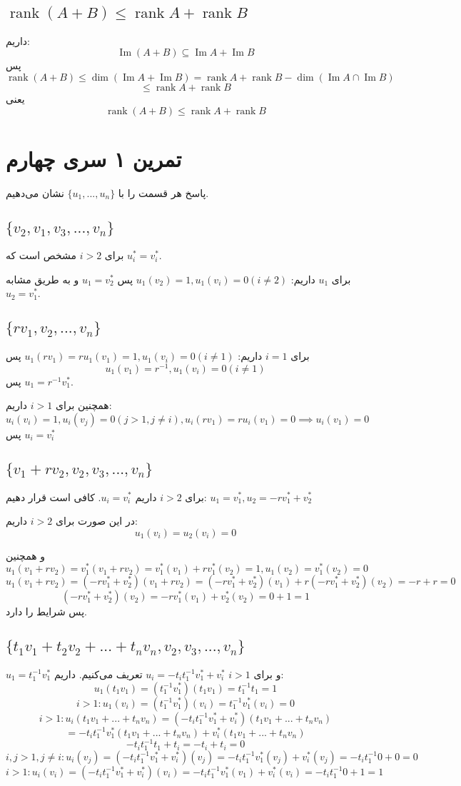 \documentclass[12pt,a4paper]{article}
\DeclareMathOperator{\rank}{rank}
\DeclareMathOperator{\im}{Im}
\begin{document}
\subsection{$\rank(A + B) \leq \rank A + \rank B$}
داریم:
$$
\im (A+B) \subseteq \im A + \im B
$$
پس
$$
\rank(A+B) \leq \dim(\im A + \im B) =
\rank A + \rank B - \dim(\im A \cap \im B)
$$
$$
\leq \rank A + \rank B
$$
یعنی
$$
\rank (A+B) \leq \rank A + \rank B
$$

\section{تمرین ۱ سری چهارم}
پاسخ هر قسمت را با 
$\{u_1, ..., u_n\}$
نشان می‌دهیم.
\subsection{
$\{v_2, v_1, v_3, ..., v_n\}$
}
برای $i > 2$ مشخص است که 
$u^{*}_i = v^{*}_i$.

برای 
$u_1$
داریم:
$u_1(v_2) = 1, u_1(v_i) = 0 (i \neq 2)$
پس
$u_1 = v^{*}_2$
و به طریق مشابه 
$u_2 = v^{*}_1$.

\subsection{
$\{rv_1, v_2, ..., v_n\}$
}
برای $i=1$ داریم:
$u_1(rv_1) = ru_1(v_1) = 1, u_1(v_i) = 0 (i \neq 1)$
پس 
$$u_1(v_1) = r^{-1}, u_1(v_i) = 0 (i \neq 1)$$
پس
$u_1 = r^{-1}v^*_1$.

همچنین برای $i > 1$ داریم:
$$u_i(v_i) = 1, u_i(v_j) = 0 (j > 1, j \neq i), u_i(rv_1) = r u_i(v_1) = 0 \implies u_i(v_1) = 0$$
پس $u_i = v^*_i$
\subsection{
$\{v_1 + r v_2, v_2, v_3, ..., v_n\}$
}
برای $i > 2$ داریم 
$u_i = v^*_i$.
کافی است قرار دهیم:
$u_1 = v^*_1, u_2 = -rv^*_1 + v^*_2$

در این صورت برای 
$i > 2$
داریم:
$$u_1(v_i) = u_2(v_i) = 0$$

و همچنین
$$
u_1(v_1+rv_2) = v^*_1(v_1 + rv_2) = v^*_1(v_1) + rv^*_1(v_2) = 1, u_1(v_2) = v^*_1(v_2) = 0
$$
$$
u_1(v_1+rv_2) = (-rv^*_1 + v^*_2)(v_1 + rv_2) = (-rv^*_1 + v^*_2)(v_1) + r(-rv^*_1 + v^*_2)(v_2) = -r + r = 0$$
$$(-rv^*_1 + v^*_2)(v_2) = -rv^*_1(v_1) + v^*_2(v_2) = 0 + 1 = 1
$$
پس شرایط را دارد.
\subsection{
$\{t_1 v_1 + t_2 v_2 + ... + t_n v_n, v_2, v_3, ..., v_n\}$
}
$u_1 = t_1^{-1}v^*_1$
و برای $i>1$
$u_i = - t_i t_1^{-1} v^*_1 + v^*_i$
تعریف می‌کنیم. داریم:
$$u_1(t_1v_1) = (t_1^{-1}v^*_1)(t_1v_1) = t_1^{-1}t_1 = 1$$
$$ i > 1: u_1(v_i) = (t_1^{-1}v^*_1)(v_i) = t_1^{-1}v^*_1(v_i) = 0$$
$$ i > 1: u_i(t_1 v_1 + ... + t_n v_n) = 
(- t_i t_1^{-1} v^*_1 + v^*_i)(t_1 v_1 + ... + t_n v_n)
$$$$= - t_i t_1^{-1} v^*_1(t_1 v_1 + ... + t_n v_n) + v^*_i(t_1 v_1 + ... + t_n v_n)$$$$
- t_i t_1^{-1} t_1 + t_i = -t_i + t_i = 0
$$
$$
i, j > 1, j \neq i: u_i(v_j) = (- t_i t_1^{-1} v^*_1 + v^*_i)(v_j) = - t_i t_1^{-1} v^*_1(v_j) + v^*_i(v_j) = - t_i t_1^{-1} 0 + 0 = 0
$$
$$ i > 1: u_i(v_i) = (- t_i t_1^{-1} v^*_1 + v^*_i)(v_i) = - t_i t_1^{-1} v^*_1(v_1) + v^*_i(v_i) = 
- t_i t_1^{-1} 0 + 1 = 1
$$
\end{document}
